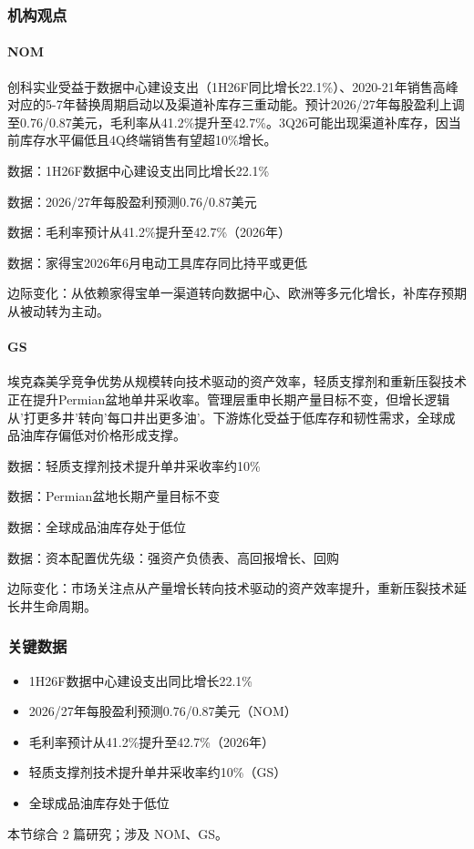 \documentclass[11pt]{ctexart}
\begin{document}
\subsubsection*{机构观点}
\paragraph{NOM} 创科实业受益于数据中心建设支出（1H26F同比增长22.1\%）、2020-21年销售高峰对应的5-7年替换周期启动以及渠道补库存三重动能。预计2026/27年每股盈利上调至0.76/0.87美元，毛利率从41.2\%提升至42.7\%。3Q26可能出现渠道补库存，因当前库存水平偏低且4Q终端销售有望超10\%增长。
{\small\color{refgray}数据：1H26F数据中心建设支出同比增长22.1\%\par}
{\small\color{refgray}数据：2026/27年每股盈利预测0.76/0.87美元\par}
{\small\color{refgray}数据：毛利率预计从41.2\%提升至42.7\%（2026年）\par}
{\small\color{refgray}数据：家得宝2026年6月电动工具库存同比持平或更低\par}
{\small\color{refgray}边际变化：从依赖家得宝单一渠道转向数据中心、欧洲等多元化增长，补库存预期从被动转为主动。\par}
\paragraph{GS} 埃克森美孚竞争优势从规模转向技术驱动的资产效率，轻质支撑剂和重新压裂技术正在提升Permian盆地单井采收率。管理层重申长期产量目标不变，但增长逻辑从'打更多井'转向'每口井出更多油'。下游炼化受益于低库存和韧性需求，全球成品油库存偏低对价格形成支撑。
{\small\color{refgray}数据：轻质支撑剂技术提升单井采收率约10\%\par}
{\small\color{refgray}数据：Permian盆地长期产量目标不变\par}
{\small\color{refgray}数据：全球成品油库存处于低位\par}
{\small\color{refgray}数据：资本配置优先级：强资产负债表、高回报增长、回购\par}
{\small\color{refgray}边际变化：市场关注点从产量增长转向技术驱动的资产效率提升，重新压裂技术延长井生命周期。\par}
\subsubsection*{关键数据}
\begin{itemize}
  \item 1H26F数据中心建设支出同比增长22.1\%
  \item 2026/27年每股盈利预测0.76/0.87美元（NOM）
  \item 毛利率预计从41.2\%提升至42.7\%（2026年）
  \item 轻质支撑剂技术提升单井采收率约10\%（GS）
  \item 全球成品油库存处于低位
\end{itemize}
{\small\color{refgray}本节综合 2 篇研究；涉及 NOM、GS。}
\newpage
\end{document}
